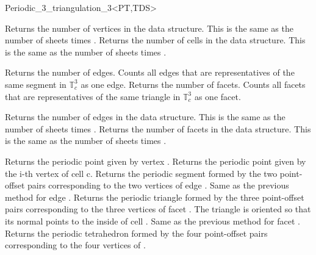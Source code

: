 \begin{ccRefClass}{Periodic_3_triangulation_3<PT,TDS>}
\begin{ccAdvanced}
{Returns the number of vertices in the data structure. This is the
  same as the number of sheets times . }
\ccGlue
{}
{Returns the number of cells in the data structure. This is the same
  as the number of sheets times .}
\end{ccAdvanced}


{Returns the number of edges. Counts all edges that are
  representatives of the same segment in $\mathbb T_c^3$ as one edge.}
\ccGlue
{}
{Returns the number of facets. Counts all facets that are
  representatives of the same triangle in $\mathbb T_c^3$ as one
  facet.}

\begin{ccAdvanced}
{Returns the number of edges in the data structure. This is the same
  as the number of sheets times .}
\ccGlue
{}
{Returns the number of facets in the data structure. This is the same
  as the number of sheets times .}
\end{ccAdvanced}


{Returns the periodic point given by vertex .}
\ccGlue
{}
{Returns the periodic point given by the i-th vertex of cell c.
}
\ccGlue
{} 
{Returns the periodic segment formed by the two point-offset pairs
  corresponding to the two vertices of edge .
}
\ccGlue
{}
{Same as the previous method for edge .}
\ccGlue
{} 
{Returns the periodic triangle formed by the three point-offset pairs
  corresponding to the three vertices of facet
. The triangle is oriented so that its normal points to the
inside of cell .
}
\ccGlue
{}
{Same as the previous method for facet .}
\ccGlue
{}
{Returns the periodic tetrahedron formed by the four point-offset pairs
  corresponding to the four vertices of .}


\end{ccRefClass}
